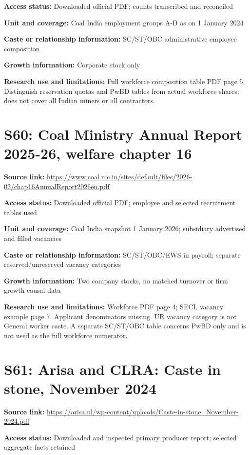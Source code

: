 \documentclass[11pt,a4paper]{report}
\begin{document}
\textbf{Access status:} Downloaded official PDF; counts transcribed and reconciled

\textbf{Unit and coverage:} Coal India employment groups A-D as on 1 January 2024

\textbf{Caste or relationship information:} SC/\allowbreak{}ST/\allowbreak{}OBC administrative employee composition

\textbf{Growth information:} Corporate stock only

\textbf{Research use and limitations:} Full workforce composition table PDF page 5. Distinguish reservation quotas and PwBD tables from actual workforce shares; does not cover all Indian miners or all contractors.

\section{S60: Coal Ministry Annual Report 2025-26, welfare chapter 16}\hypertarget{S60}{}
\textbf{Source link:} \url{https://www.coal.nic.in/sites/default/files/2026-02/chap16AnnualReport2026en.pdf}

\textbf{Access status:} Downloaded official PDF; employee and selected recruitment tables used

\textbf{Unit and coverage:} Coal India snapshot 1 January 2026; subsidiary advertised and filled vacancies

\textbf{Caste or relationship information:} SC/\allowbreak{}ST/\allowbreak{}OBC/\allowbreak{}EWS in payroll; separate reserved/\allowbreak{}unreserved vacancy categories

\textbf{Growth information:} Two company stocks, no matched turnover or firm growth causal data

\textbf{Research use and limitations:} Workforce PDF page 4; SECL vacancy example page 7. Applicant denominators missing. UR vacancy category is not General worker caste. A separate SC/\allowbreak{}ST/\allowbreak{}OBC table concerns PwBD only and is not used as the full workforce numerator.

\section{S61: Arisa and CLRA: Caste in stone, November 2024}\hypertarget{S61}{}
\textbf{Source link:} \url{https://arisa.nl/wp-content/uploads/Caste-in-stone_November-2024.pdf}

\textbf{Access status:} Downloaded and inspected primary producer report; selected aggregate facts retained
\end{document}
